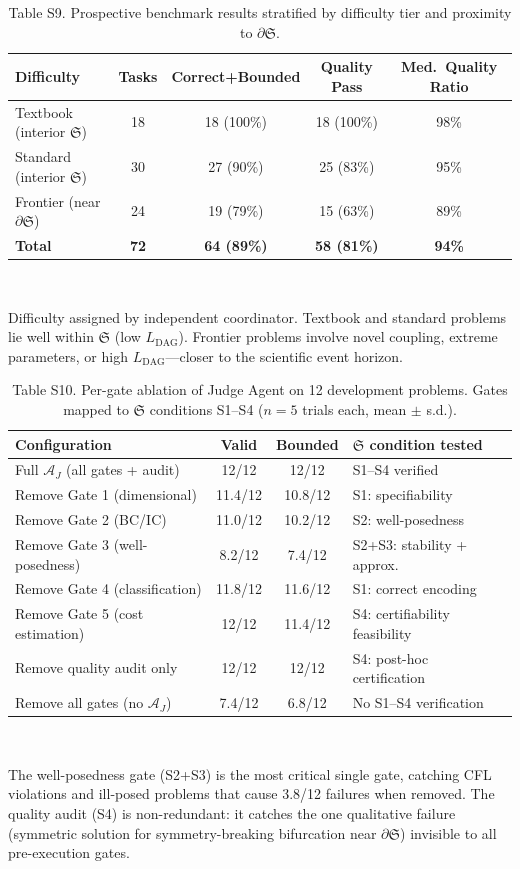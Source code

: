 \documentclass[11pt,a4paper]{article}
\newcommand{\Sclass}{\mathfrak{S}}
\newcommand{\Agent}{\mathcal{A}}
\begin{document}
\begin{table}[htbp]
\centering
\caption{Table S9. Prospective benchmark results stratified by difficulty tier and proximity to $\partial \Sclass$.}
\small
\begin{tabularx}{\textwidth}{Xcccc}
\toprule
\textbf{Difficulty} & \textbf{Tasks} & \textbf{Correct+Bounded} & \textbf{Quality Pass} & \textbf{Med.\ Quality Ratio} \\
\midrule
Textbook (interior $\Sclass$) & 18 & 18 (100\%) & 18 (100\%) & 98\% \\
Standard (interior $\Sclass$) & 30 & 27 (90\%) & 25 (83\%) & 95\% \\
Frontier (near $\partial \Sclass$) & 24 & 19 (79\%) & 15 (63\%) & 89\% \\
\midrule
\textbf{Total} & \textbf{72} & \textbf{64 (89\%)} & \textbf{58 (81\%)} & \textbf{94\%} \\
\bottomrule
\end{tabularx}\\[3pt]
\raggedright\scriptsize Difficulty assigned by independent coordinator. Textbook and standard problems lie well within $\Sclass$ (low $L_{\text{DAG}}$). Frontier problems involve novel coupling, extreme parameters, or high $L_{\text{DAG}}$---closer to the scientific event horizon.
\end{table}

\begin{table}[htbp]
\centering
\caption{Table S10. Per-gate ablation of Judge Agent on 12 development problems. Gates mapped to $\Sclass$ conditions S1--S4 ($n = 5$ trials each, mean $\pm$ s.d.).}
\small
\begin{tabularx}{\textwidth}{Xccl}
\toprule
\textbf{Configuration} & \textbf{Valid} & \textbf{Bounded} & \textbf{$\Sclass$ condition tested} \\
\midrule
Full $\Agent_J$ (all gates + audit) & 12/12 & 12/12 & S1--S4 verified \\
Remove Gate 1 (dimensional) & 11.4/12 & 10.8/12 & S1: specifiability \\
Remove Gate 2 (BC/IC) & 11.0/12 & 10.2/12 & S2: well-posedness \\
Remove Gate 3 (well-posedness) & 8.2/12 & 7.4/12 & S2+S3: stability + approx. \\
Remove Gate 4 (classification) & 11.8/12 & 11.6/12 & S1: correct encoding \\
Remove Gate 5 (cost estimation) & 12/12 & 11.4/12 & S4: certifiability feasibility \\
Remove quality audit only & 12/12 & 12/12 & S4: post-hoc certification \\
Remove all gates (no $\Agent_J$) & 7.4/12 & 6.8/12 & No S1--S4 verification \\
\bottomrule
\end{tabularx}\\[3pt]
\raggedright\scriptsize The well-posedness gate (S2+S3) is the most critical single gate, catching CFL violations and ill-posed problems that cause 3.8/12 failures when removed. The quality audit (S4) is non-redundant: it catches the one qualitative failure (symmetric solution for symmetry-breaking bifurcation near $\partial \Sclass$) invisible to all pre-execution gates.
\end{table}
\end{document}
